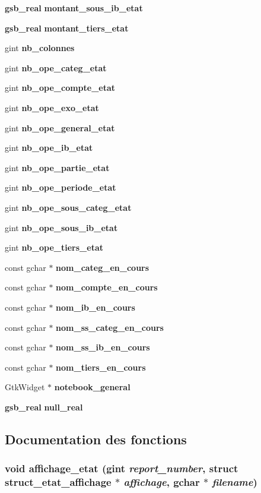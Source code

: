 \begin{DoxyCompactItemize}
{\bf gsb\_\-real} {\bf montant\_\-sous\_\-ib\_\-etat}
\item 
{\bf gsb\_\-real} {\bf montant\_\-tiers\_\-etat}
\item 
gint {\bf nb\_\-colonnes}
\item 
gint {\bf nb\_\-ope\_\-categ\_\-etat}
\item 
gint {\bf nb\_\-ope\_\-compte\_\-etat}
\item 
gint {\bf nb\_\-ope\_\-exo\_\-etat}
\item 
gint {\bf nb\_\-ope\_\-general\_\-etat}
\item 
gint {\bf nb\_\-ope\_\-ib\_\-etat}
\item 
gint {\bf nb\_\-ope\_\-partie\_\-etat}
\item 
gint {\bf nb\_\-ope\_\-periode\_\-etat}
\item 
gint {\bf nb\_\-ope\_\-sous\_\-categ\_\-etat}
\item 
gint {\bf nb\_\-ope\_\-sous\_\-ib\_\-etat}
\item 
gint {\bf nb\_\-ope\_\-tiers\_\-etat}
\item 
const gchar $\ast$ {\bf nom\_\-categ\_\-en\_\-cours}
\item 
const gchar $\ast$ {\bf nom\_\-compte\_\-en\_\-cours}
\item 
const gchar $\ast$ {\bf nom\_\-ib\_\-en\_\-cours}
\item 
const gchar $\ast$ {\bf nom\_\-ss\_\-categ\_\-en\_\-cours}
\item 
const gchar $\ast$ {\bf nom\_\-ss\_\-ib\_\-en\_\-cours}
\item 
const gchar $\ast$ {\bf nom\_\-tiers\_\-en\_\-cours}
\item 
GtkWidget $\ast$ {\bf notebook\_\-general}
\item 
{\bf gsb\_\-real} {\bf null\_\-real}
\end{DoxyCompactItemize}


\subsection{Documentation des fonctions}
\subsubsection[{affichage\_\-etat}]{\setlength{\rightskip}{0pt plus 5cm}void affichage\_\-etat (gint {\em report\_\-number}, \/  struct {\bf struct\_\-etat\_\-affichage} $\ast$ {\em affichage}, \/  gchar $\ast$ {\em filename})}\label{etats__calculs_8c_ab2abfe27729153161fd891d3e3f79483}


